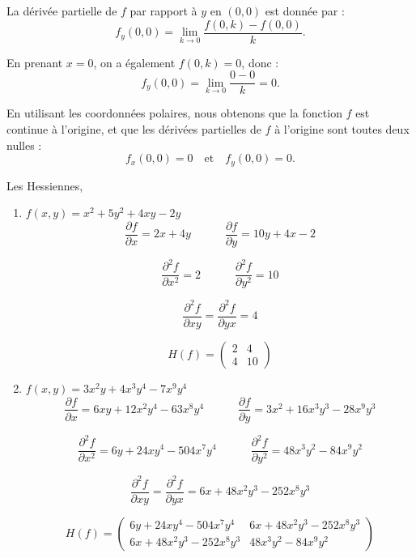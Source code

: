 \begin{solution}
\begin{enumerate}
    La dérivée partielle de \( f \) par rapport à \( y \) en \( (0, 0) \) est donnée par :
    \[
    f_y(0, 0) = \lim_{k \to 0} \frac{f(0, k) - f(0, 0)}{k}.
    \]
    
    En prenant \( x = 0 \), on a également \( f(0, k) = 0 \), donc :
    \[
    f_y(0, 0) = \lim_{k \to 0} \frac{0 - 0}{k} = 0.
    \]

    En utilisant les coordonnées polaires, nous obtenons que la fonction \( f \) est continue à l'origine, et que les dérivées partielles de \( f \) à l'origine sont toutes deux nulles :
    \[
    f_x(0, 0) = 0 \quad \text{et} \quad f_y(0, 0) = 0.
    \]

\end{enumerate}
\end{solution}

\begin{solution}
Les Hessiennes, 
    \begin{enumerate}
        \item $f(x,y) = x^2+5y^2+4xy-2y$
        \[
        \frac{\partial f}{\partial x} = 2x + 4y \quad \quad \quad
        \frac{\partial f}{\partial y} = 10y + 4x - 2
        \]
        
        \[
        \frac{\partial^2 f}{\partial x^2} = 2
        \quad \quad \quad
        \frac{\partial^2 f}{\partial y^2} = 10
        \]
        
        \[
        \frac{\partial^2 f}{\partial xy} = \frac{\partial^2 f}{\partial yx} = 4
        \]
        
        \[ H(f) = \begin{pmatrix}
        2 & 4 \\
        4 & 10
        \end{pmatrix}
        \]
    
        \item $f(x,y)=3x^2y+4x^3y^4-7x^9y^4$
        \[
        \frac{\partial f}{\partial x} = 6xy +12 x^2 y^4 - 63 x^8 y^4 \quad \quad \quad
        \frac{\partial f}{\partial y} = 3x^2 + 16 x^3 y^3 - 28 x^9 y^3
        \]
        
        \[
        \frac{\partial^2 f}{\partial x^2} = 6y +24x y^4 - 504 x^7 y^4 \quad \quad \quad
        \frac{\partial^2 f}{\partial y^2} = 48 x^3 y^2 - 84x^9 y^2
        \]
        
        \[
        \frac{\partial^2 f}{\partial xy} = \frac{\partial^2 f}{\partial yx} = 6x + 48 x^2 y^3 - 252 x^8 y^3
        \]

        \[
        H(f) = \begin{pmatrix}
        6y + 24x y^4 - 504 x^7 y^4 & 6x + 48 x^2 y^3 - 252 x^8 y^3 \\
        6x + 48 x^2 y^3 - 252 x^8 y^3 & 48 x^3 y^2 - 84x^9 y^2
        \end{pmatrix}
        \]


\end{enumerate}
\end{solution}
